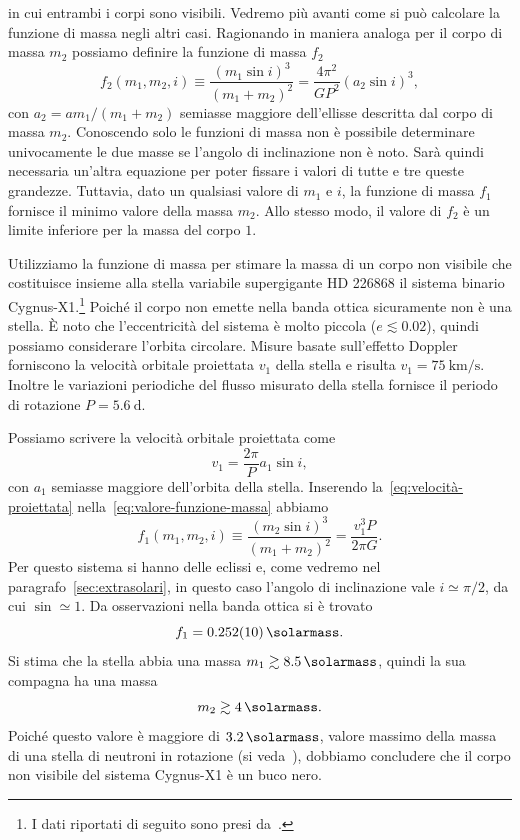 in cui entrambi i corpi sono visibili. Vedremo più avanti come si può calcolare
la funzione di massa negli altri casi. Ragionando in maniera analoga per il
corpo di massa $m_2$ possiamo definire la funzione di massa $f_2$
\begin{equation}
  f_2(m_1,m_2,i) \equiv \frac{(m_1\sin i)^3}{(m_1 + m_2)^2} =
  \frac{4\pi^2}{GP^2}(a_2\sin i)^3,
\end{equation}
con $a_2 = am_1/(m_1+m_2)$ semiasse maggiore dell'ellisse descritta dal corpo di
massa $m_2$. Conoscendo solo le funzioni di massa non è possibile determinare
univocamente le due masse se l'angolo di inclinazione non è noto. Sarà quindi
necessaria un'altra equazione per poter fissare i valori di tutte e tre queste
grandezze. Tuttavia, dato un qualsiasi valore di $m_1$ e $i$, la funzione di
massa $f_1$ fornisce il minimo valore della massa $m_2$. Allo stesso modo, il
valore di $f_2$ è un limite inferiore per la massa del corpo $1$.

Utilizziamo la funzione di massa per stimare la massa di un corpo non visibile
che costituisce insieme alla stella variabile supergigante HD 226868 il sistema
binario
Cygnus-X1.\footnote{I dati riportati di seguito sono presi
  da~\textcite[212]{melia:astrophysics}.} Poiché il corpo non emette nella banda
ottica sicuramente non è una stella. È noto che l'eccentricità del sistema è
molto piccola ($e \lesssim 0.02$), quindi possiamo considerare l'orbita
circolare. Misure basate sull'effetto Doppler forniscono la velocità orbitale
proiettata $v_1$ della stella e risulta $v_1 =
\SI{75}{\kilo\metre\per\second}$. Inoltre le variazioni periodiche del flusso
misurato della stella fornisce il periodo di rotazione $P = \SI{5.6}{\day}$.

Possiamo scrivere la velocità orbitale proiettata come
\begin{equation}
  \label{eq:velocità-proiettata}
  v_1 = \frac{2\pi}{P}a_1\sin i,
\end{equation}
con $a_1$ semiasse maggiore dell'orbita della stella. Inserendo
la~\eqref{eq:velocità-proiettata} nella~\eqref{eq:valore-funzione-massa} abbiamo
\begin{equation}
  f_1(m_1,m_2,i) \equiv \frac{(m_2\sin i)^3}{(m_1 + m_2)^2} = \frac{v_1^3P}{2\pi
    G}.
\end{equation}
Per questo sistema si hanno delle eclissi e, come vedremo nel
paragrafo~\ref{sec:extrasolari}, in questo caso l'angolo di inclinazione vale
$i \simeq \pi/2$, da cui $\sin \simeq 1$. Da osservazioni nella banda ottica si
è trovato
\begin{equation}
  f_1 = \SI{0.252(10)}{\solarmass}.
\end{equation}
Si stima che la stella abbia una massa $m_1 \gtrsim \SI{8.5}{\solarmass}$,
quindi la sua compagna ha una massa
\begin{equation}
  m_2 \gtrsim \SI{4}{\solarmass}.
\end{equation}
Poiché questo valore è maggiore di $\SI{3.2}{\solarmass}$, valore massimo della
massa di una stella di neutroni in rotazione (si
veda~\textcite{1974PhRvL..32..324R}), dobbiamo concludere che il corpo non
visibile del sistema Cygnus-X1 è un buco nero.

